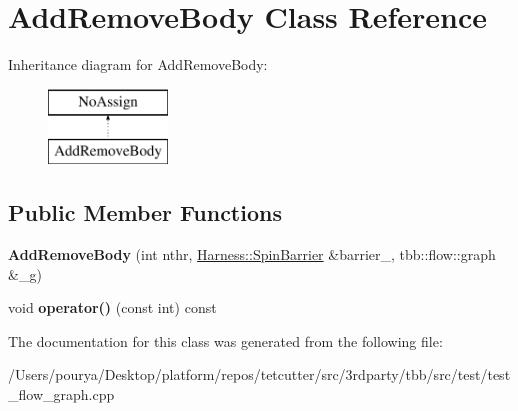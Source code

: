 \hypertarget{classAddRemoveBody}{}\section{Add\+Remove\+Body Class Reference}
\label{classAddRemoveBody}
Inheritance diagram for Add\+Remove\+Body\+:\begin{figure}[H]
\begin{center}
\leavevmode
\includegraphics[height=2.000000cm]{classAddRemoveBody}
\end{center}
\end{figure}
\subsection*{Public Member Functions}
\begin{DoxyCompactItemize}
\item 
\hypertarget{classAddRemoveBody_a9ded525571e5b35a737702c300ca3bcb}{}{\bfseries Add\+Remove\+Body} (int nthr, \hyperlink{classHarness_1_1SpinBarrier}{Harness\+::\+Spin\+Barrier} \&barrier\+\_\+, tbb\+::flow\+::graph \&\+\_\+g)\label{classAddRemoveBody_a9ded525571e5b35a737702c300ca3bcb}

\item 
\hypertarget{classAddRemoveBody_a54e31594aa23c38b7c3d211590904b6c}{}void {\bfseries operator()} (const int) const \label{classAddRemoveBody_a54e31594aa23c38b7c3d211590904b6c}

\end{DoxyCompactItemize}


The documentation for this class was generated from the following file\+:\begin{DoxyCompactItemize}
\item 
/\+Users/pourya/\+Desktop/platform/repos/tetcutter/src/3rdparty/tbb/src/test/test\+\_\+flow\+\_\+graph.\+cpp\end{DoxyCompactItemize}
